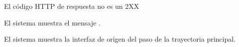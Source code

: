 {  %

  \begin{trayectoriaAlternativa}
    {El código HTTP de respuesta no es un 2XX}

    \item El sistema muestra el mensaje
      .

    \item El sistema muestra la interfaz de origen del paso
       de la trayectoria principal.

  \end{trayectoriaAlternativa}
}
